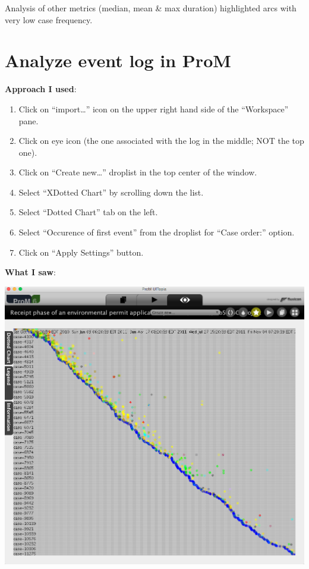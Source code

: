 \documentclass[]{article}
\begin{document}
Analysis of other metrics (median, mean \& max duration) highlighted
arcs with very low case frequency.

\section{Analyze event log in ProM}\label{analyze-event-log-in-prom}

\textbf{Approach I used}:

\begin{enumerate}
\def\labelenumi{\arabic{enumi}.}
\itemsep1pt\parskip0pt
\item
  Click on ``import\ldots{}'' icon on the upper right hand side of the
  ``Workspace'' pane.\\
\item
  Click on eye icon (the one associated with the log in the middle; NOT
  the top one).
\item
  Click on ``Create new\ldots{}'' droplist in the top center of the
  window.
\item
  Select ``XDotted Chart'' by scrolling down the list.
\item
  Select ``Dotted Chart'' tab on the left.
\item
  Select ``Occurence of first event'' from the droplist for ``Case
  order:'' option.
\item
  Click on ``Apply Settings'' button.
\end{enumerate}

\textbf{What I saw}:

\includegraphics{CoSeLoG_Step_04.png}
\end{document}
